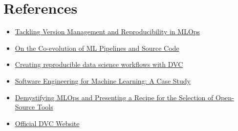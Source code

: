 \documentclass[12pt]{article}
\begin{document}
\section{References}
\begin{itemize}
    \item \href{https://repositorio-aberto.up.pt/bitstream/10216/152181/2/636962.pdf}{Tackling Version Management and Reproducibility in MLOps}
    \item \href{https://mcis.cs.queensu.ca/publications/2021/saner.pdf}{On the Co-evolution of ML Pipelines and Source Code}
    \item \href{https://medium.com/y-data-stories/creating-reproducible-data-science-workflows-with-dvc-3bf058e9797b}{Creating reproducible data science workflows with DVC}
    \item \href{https://www.microsoft.com/en-us/research/uploads/prod/2019/03/amershi-icse-2019_Software_Engineering_for_Machine_Learning.pdf}{Software Engineering for Machine Learning: A Case Study}
    \item \href{https://www.mdpi.com/2076-3417/11/19/8861}{Demystifying MLOps and Presenting a Recipe for the Selection of Open-Source Tools}
    \item \href{https://dvc.org}{Official DVC Website}
\end{itemize}
       
\end{document}
